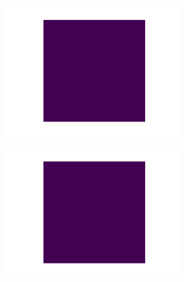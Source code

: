 \documentclass[target=bach,aauheader=,style=]{thud}
\begin{document}
\begin{figure}[ht]
\begin{subfigure}{0.32\textwidth}
  \centering
  \includegraphics[width=\linewidth]{imgs/dataset/inflam.png}
  \caption{}
\end{subfigure}\hfill
\begin{subfigure}{0.32\textwidth}
  \centering
  \includegraphics[width=\linewidth]{imgs/dataset/dead.png}
  \caption{}
\end{subfigure}\hfill
\begin{subfigure}{0.32\textwidth}
  \centering

\end{subfigure}
\end{figure}
\end{document}
